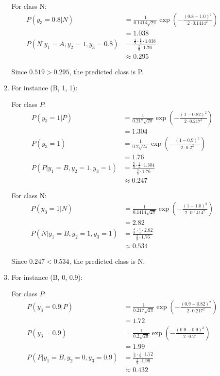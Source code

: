 \documentclass{article}
\begin{document}
\begin{enumerate}[leftmargin=\labelsep]
\begin{enumerate}
    
    For class N:
    \begin{align*}
    P(y_3=0.8 | N) &= \frac{1}{0.1414 \sqrt{2\pi}} \exp\left(-\frac{(0.8 - 1.0)^2}{2 \cdot 0.1414^2}\right) \\[10pt]
    &= 1.038\\
    P(N | y_1=A, y_2=1, y_3=0.8) &= \frac{\frac{4}{9} \cdot \frac{1}{4} \cdot 1.038}{\frac{2}{9} \cdot 1.76} \\[10pt]
    &\approx 0.295
    \end{align*}
    
    Since $0.519 > 0.295$, the predicted class is P.
    
    \item For instance (B, 1, 1):
    
    For class \( P \):
    \begin{align*}
    P(y_3=1 | P) &= \frac{1}{0.217 \sqrt{2\pi}} \exp\left(-\frac{(1 - 0.82)^2}{2 \cdot 0.217^2}\right) \\[10pt]
    &=1.304 \\
    P(y_3=1) &= \frac{1}{0.2 \sqrt{2\pi}} \exp\left(-\frac{(1 - 0.9)^2}{2 \cdot 0.2^2}\right) \\[10pt]
    &= 1.76\\
    P(P | y_1=B, y_2=1, y_3=1) &= \frac{\frac{5}{9} \cdot \frac{1}{5} \cdot 1.304}{\frac{3}{9} \cdot 1.76} \\[10pt]
    &\approx 0.247 
    \end{align*}

    
    For class N:
    \begin{align*}
    P(y_3=1 | N) &= \frac{1}{0.1414 \sqrt{2\pi}} \exp\left(-\frac{(1 - 1.0)^2}{2 \cdot 0.1414^2}\right) \\[10pt]
    &= 2.82\\
    P(N | y_1=B, y_2=1, y_3=1) &= \frac{\frac{4}{9} \cdot \frac{1}{4} \cdot 2.82}{\frac{3}{9} \cdot 1.76} \\[10pt]
    &\approx 0.534
    \end{align*}
    
    Since $0.247 < 0.534$, the predicted class is N.
    
    \item For instance (B, 0, 0.9):
    
    For class \( P \):
    \begin{align*}
    P(y_3=0.9 | P) &= \frac{1}{0.217 \sqrt{2\pi}} \exp\left(-\frac{(0.9 - 0.82)^2}{2 \cdot 0.217^2}\right) \\[10pt]
    &= 1.72\\
    P(y_3=0.9) &= \frac{1}{0.2 \sqrt{2\pi}} \exp\left(-\frac{(0.9 - 0.9)^2}{2 \cdot 0.2^2}\right) \\[10pt]
    &= 1.99\\
    P(P | y_1=B, y_2=0, y_3=0.9) &= \frac{\frac{5}{9} \cdot \frac{1}{5} \cdot 1.72}{\frac{2}{9} \cdot 1.99} \\[10pt]
    &\approx 0.432
    \end{align*}


\end{enumerate}
\end{enumerate}
\end{document}

